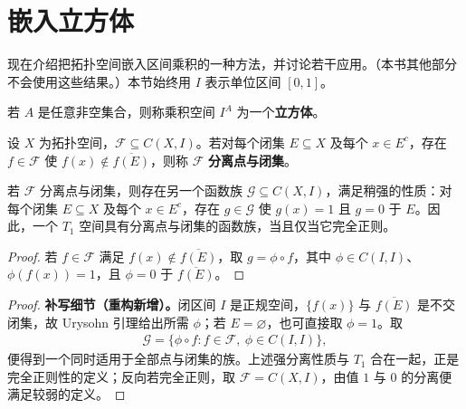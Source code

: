 \documentclass[../../main.tex]{subfiles}
\begin{document}
\clearpage
\section{嵌入立方体}\label{section:ch04-cube-embeddings}
现在介绍把拓扑空间嵌入区间乘积的一种方法，并讨论若干应用。（本书其他部分不会使用这些结果。）本节始终用 $I$ 表示单位区间 $[0,1]$。
\begin{definition}[立方体]\label{definition:ch04-cube}
若 $A$ 是任意非空集合，则称乘积空间 $I^A$ 为一个\textbf{立方体}。
\end{definition}
\begin{definition}[分离点与闭集的函数族]\label{definition:ch04-points-closed-separation}
设 $X$ 为拓扑空间，$\mathcal F\subseteq C(X,I)$。若对每个闭集 $E\subseteq X$ 及每个 $x\in E^c$，存在 $f\in\mathcal F$ 使 $f(x)\notin\overline{f(E)}$，则称 $\mathcal F$ \textbf{分离点与闭集}。
\end{definition}
\begin{proposition}\label{proposition:ch04-strong-points-closed-separation}
若 $\mathcal F$ 分离点与闭集，则存在另一个函数族 $\mathcal G\subseteq C(X,I)$，满足稍强的性质：对每个闭集 $E\subseteq X$ 及每个 $x\in E^c$，存在 $g\in\mathcal G$ 使 $g(x)=1$ 且 $g=0$ 于 $E$。因此，一个 $T_1$ 空间具有分离点与闭集的函数族，当且仅当它完全正则。
\end{proposition}
\begin{proof}
若 $f\in\mathcal F$ 满足 $f(x)\notin\overline{f(E)}$，取 $g=\phi\circ f$，其中 $\phi\in C(I,I)$、$\phi(f(x))=1$，且 $\phi=0$ 于 $\overline{f(E)}$。
\end{proof}
\begin{proof}
\textbf{补写细节（重构新增）。}闭区间 $I$ 是正规空间，$\{f(x)\}$ 与 $\overline{f(E)}$ 是不交闭集，故 Urysohn 引理给出所需 $\phi$；若 $E=\varnothing$，也可直接取 $\phi=1$。取
\begin{align*}
\mathcal G=\{\phi\circ f:f\in\mathcal F,\ \phi\in C(I,I)\},
\end{align*}
便得到一个同时适用于全部点与闭集的族。上述强分离性质与 $T_1$ 合在一起，正是完全正则性的定义；反向若完全正则，取 $\mathcal F=C(X,I)$，由值 $1$ 与 $0$ 的分离便满足较弱的定义。
\end{proof}
\end{document}
